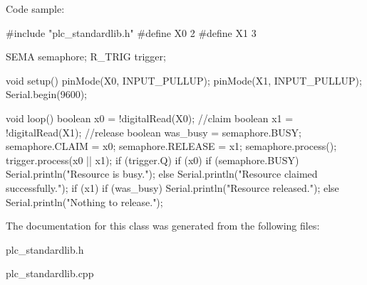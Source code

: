 Code sample\+: \begin{DoxyVerb}#include "plc_standardlib.h"
#define X0 2
#define X1 3

SEMA semaphore;
R_TRIG trigger;

void setup() {
    pinMode(X0, INPUT_PULLUP);
    pinMode(X1, INPUT_PULLUP);
    Serial.begin(9600);
}

void loop() {
    boolean x0 = !digitalRead(X0); //claim
    boolean x1 = !digitalRead(X1); //release
    boolean was_busy = semaphore.BUSY;
    semaphore.CLAIM = x0;
    semaphore.RELEASE = x1;
    semaphore.process();
    trigger.process(x0 || x1);
    if (trigger.Q) {
        if (x0) {
            if (semaphore.BUSY) {
                Serial.println("Resource is busy.");
            }
            else {
                Serial.println("Resource claimed successfully.");
            }
        }
        if (x1) {
            if (was_busy) {
                Serial.println("Resource released.");
            }
            else {
                Serial.println("Nothing to release.");
            }
        }
    }
}\end{DoxyVerb}
 

The documentation for this class was generated from the following files\+:\begin{DoxyCompactItemize}
\item 
plc\+\_\+standardlib.\+h\item 
plc\+\_\+standardlib.\+cpp\end{DoxyCompactItemize}
